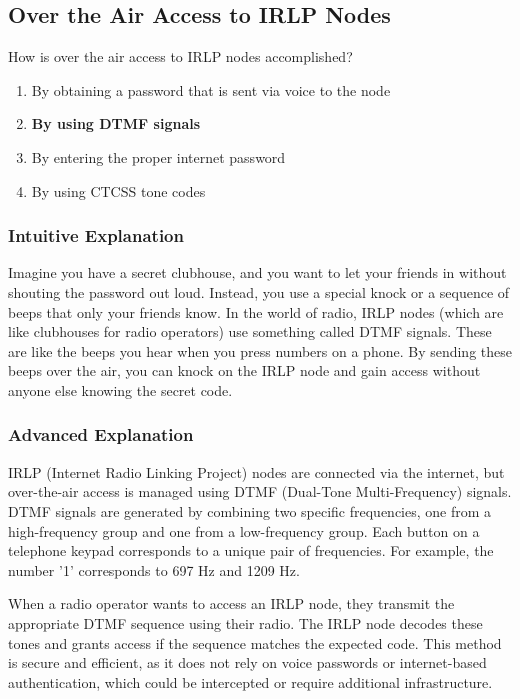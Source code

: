 \subsection{Over the Air Access to IRLP Nodes}
\label{T8C06}

\begin{tcolorbox}[colback=gray!10!white,colframe=black!75!black,title=T8C06]
How is over the air access to IRLP nodes accomplished?
\begin{enumerate}[label=\Alph*]
    \item By obtaining a password that is sent via voice to the node
    \item \textbf{By using DTMF signals}
    \item By entering the proper internet password
    \item By using CTCSS tone codes
\end{enumerate}
\end{tcolorbox}

\subsubsection{Intuitive Explanation}
Imagine you have a secret clubhouse, and you want to let your friends in without shouting the password out loud. Instead, you use a special knock or a sequence of beeps that only your friends know. In the world of radio, IRLP nodes (which are like clubhouses for radio operators) use something called DTMF signals. These are like the beeps you hear when you press numbers on a phone. By sending these beeps over the air, you can knock on the IRLP node and gain access without anyone else knowing the secret code.

\subsubsection{Advanced Explanation}
IRLP (Internet Radio Linking Project) nodes are connected via the internet, but over-the-air access is managed using DTMF (Dual-Tone Multi-Frequency) signals. DTMF signals are generated by combining two specific frequencies, one from a high-frequency group and one from a low-frequency group. Each button on a telephone keypad corresponds to a unique pair of frequencies. For example, the number '1' corresponds to 697 Hz and 1209 Hz.

When a radio operator wants to access an IRLP node, they transmit the appropriate DTMF sequence using their radio. The IRLP node decodes these tones and grants access if the sequence matches the expected code. This method is secure and efficient, as it does not rely on voice passwords or internet-based authentication, which could be intercepted or require additional infrastructure.

